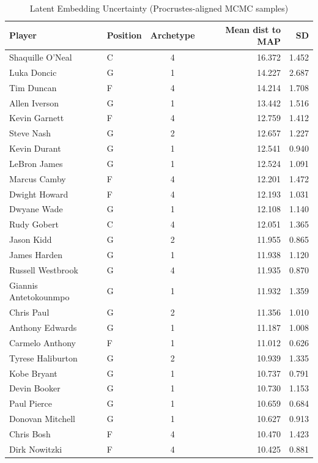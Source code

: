 \begin{table}[t]
\caption*{
{\fontsize{20}{25}\selectfont  Latent Embedding Uncertainty (Procrustes-aligned MCMC samples)\fontsize{12}{15}\selectfont }
} 
\fontsize{12.0pt}{14.0pt}\selectfont
\begin{tabular*}{\linewidth}{@{\extracolsep{\fill}}llcrr}
\toprule
Player & Position & Archetype & Mean dist to MAP & SD \\ 
\midrule\addlinespace[2.5pt]
Shaquille O'Neal & C & 4 & 16.372 & 1.452 \\ 
Luka Doncic & G & 1 & 14.227 & 2.687 \\ 
Tim Duncan & F & 4 & 14.214 & 1.708 \\ 
Allen Iverson & G & 1 & 13.442 & 1.516 \\ 
Kevin Garnett & F & 4 & 12.759 & 1.412 \\ 
Steve Nash & G & 2 & 12.657 & 1.227 \\ 
Kevin Durant & G & 1 & 12.541 & 0.940 \\ 
LeBron James & G & 1 & 12.524 & 1.091 \\ 
Marcus Camby & F & 4 & 12.201 & 1.472 \\ 
Dwight Howard & F & 4 & 12.193 & 1.031 \\ 
Dwyane Wade & G & 1 & 12.108 & 1.140 \\ 
Rudy Gobert & C & 4 & 12.051 & 1.365 \\ 
Jason Kidd & G & 2 & 11.955 & 0.865 \\ 
James Harden & G & 1 & 11.938 & 1.120 \\ 
Russell Westbrook & G & 4 & 11.935 & 0.870 \\ 
Giannis Antetokounmpo & G & 1 & 11.932 & 1.359 \\ 
Chris Paul & G & 2 & 11.356 & 1.010 \\ 
Anthony Edwards & G & 1 & 11.187 & 1.008 \\ 
Carmelo Anthony & F & 1 & 11.012 & 0.626 \\ 
Tyrese Haliburton & G & 2 & 10.939 & 1.335 \\ 
Kobe Bryant & G & 1 & 10.737 & 0.791 \\ 
Devin Booker & G & 1 & 10.730 & 1.153 \\ 
Paul Pierce & G & 1 & 10.659 & 0.684 \\ 
Donovan Mitchell & G & 1 & 10.627 & 0.913 \\ 
Chris Bosh & F & 4 & 10.470 & 1.423 \\ 
Dirk Nowitzki & F & 4 & 10.425 & 0.881 \\ 

\end{tabular*}
\end{table}
